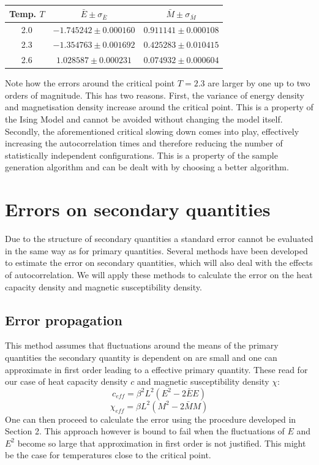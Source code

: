 \documentclass[11pt, a4paper]{scrartcl}
\begin{document}
    \begin{center}
    \begin{tabular}{|c||c|c|}
        \hline
        Temp. $T$ & $\bar{E} \pm \sigma_{\bar{E}}$ & $\bar{M} \pm \sigma_{\bar{M}}$ \\
        \hline
        \hline
        2.0 & $-1.745242 \pm 0.000160$ & $0.911141 \pm 0.000108$ \\
        \hline
        2.3 & $-1.354763 \pm 0.001692$ & $0.425283 \pm 0.010415$ \\
        \hline
        2.6 & $1.028587 \pm 0.000231$ & $0.074932 \pm 0.000604$ \\
        \hline
    \end{tabular}
    \end{center}
    Note how the errors around the critical point $T = 2.3$ are larger by one up to two orders of magnitude. This has two reasons. First, the variance of energy density and magnetisation density increase around the critical point. This is a property of the Ising Model and cannot be avoided without changing the model itself. Secondly, the aforementioned critical slowing down comes into play, effectively increasing the autocorrelation times and therefore reducing the number of statistically independent configurations. This is a property of the sample generation algorithm and can be dealt with by choosing a better algorithm.


\section{Errors on secondary quantities}
    Due to the structure of secondary quantities a standard error cannot be evaluated in the same way as for primary quantities. Several methods have been developed to estimate the error on secondary quantities, which will also deal with the effects of autocorrelation. We will apply these methods to calculate the error on the heat capacity density and magnetic susceptibility density.
\subsection{Error propagation}
    This method assumes that fluctuations around the means of the primary quantities the secondary quantity is dependent on are small and one can approximate in first order leading to a effective primary quantity. These read for our case of heat capacity density $c$ and magnetic susceptibility density $\chi$:
    $$
    c_{eff} = \beta ^ 2 L ^ 2 (E^2 - 2 \bar{E} E)
    $$
    $$
    \chi_{eff} = \beta L ^ 2 (M^2 - 2 \bar{M} M)
    $$
    One can then proceed to calculate the error using the procedure developed in Section 2. This approach however is bound to fail when the fluctuations of $E$ and $E^2$ become so large that approximation in first order is not justified. This might be the case for temperatures close to the critical point.
\end{document}
